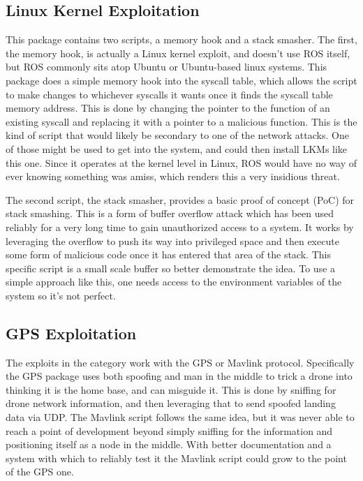 \documentclass[IEEEtran,letterpaper,10pt,notitlepage,draftclsnofoot]{article}
\begin{document}
\subsection{Linux Kernel Exploitation}
This package contains two scripts, a memory hook and a stack smasher.
The first, the memory hook, is actually a Linux kernel exploit, and doesn't use ROS itself, but ROS commonly sits atop Ubuntu or Ubuntu-based linux systems.
This package does a simple memory hook into the syscall table, which allows the script to make changes to whichever syscalls it wants once it finds the syscall table memory address.
This is done by changing the pointer to the function of an existing syscall and replacing it with a pointer to a malicious function.
This is the kind of script that would likely be secondary to one of the network attacks. One of those might be used to get into the system, and could then install LKMs like this one. Since it operates at the kernel level in Linux, ROS would have no way of ever knowing something was amiss, which renders this a very insidious threat.

The second script, the stack smasher, provides a basic proof of concept (PoC) for stack smashing.
This is a form of buffer overflow attack which has been used reliably for a very long time to gain unauthorized access to a system.
It works by leveraging the overflow to push its way into privileged space and then execute some form of malicious code once it has entered that area of the stack.
This specific script is a small scale buffer so better demonstrate the idea.
To use a simple approach like this, one needs access to the environment variables of the system so it's not perfect.

\subsection{GPS Exploitation}
The exploits in the category work with the GPS or Mavlink protocol.
Specifically the GPS package uses both spoofing and man in the middle to trick a drone into thinking it is the home base, and can misguide it.
This is done by sniffing for drone network information, and then leveraging that to send spoofed landing data via UDP.
The Mavlink script follows the same idea, but it was never able to reach a point of development beyond simply sniffing for the information and positioning itself as a node in the middle.
With better documentation and a system with which to reliably test it the Mavlink script could grow to the point of the GPS one.
\end{document}
